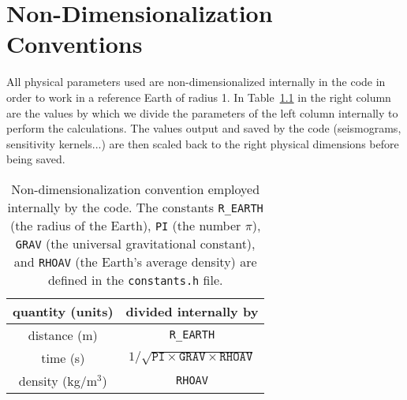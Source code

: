 \chapter{Non-Dimensionalization Conventions}\label{cha:Non-Dimensionalization-Conventions}

All physical parameters used are non-dimensionalized internally in the code
in order to work in a reference Earth of radius 1. In Table~{\small \ref{table:conventions} in the right column are the values by which
we divide the parameters of the left column internally to perform the calculations.
The values output and saved by the code (seismograms, sensitivity kernels...) are then
scaled back to the right physical dimensions before being saved.
}%
\begin{table}[ht]
\noindent
\begin{centering}
{\small }\begin{tabular}{|c|c|}
\hline
quantity (units)  & divided internally by \\
\hline
distance (m)  & \texttt{R\_EARTH} \\
time (s)  & $1/\sqrt{\texttt{PI}\times\texttt{GRAV}\times\texttt{RHOAV}}$ \\
density (kg/m$^{3}$)  & \texttt{RHOAV} \\
\hline
\end{tabular}
\par
\end{centering}{\small \par}

\caption{Non-dimensionalization convention employed internally by the code. The constants \texttt{R\_EARTH}
(the radius of the Earth), \texttt{PI} (the number $\pi$), \texttt{GRAV}
(the universal gravitational constant), and \texttt{RHOAV} (the Earth's
average density) are defined in the \texttt{constants.h} file. }

{\small \label{table:conventions} }
\end{table}
{\small \par}


